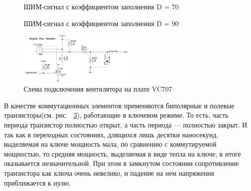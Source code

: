 \documentclass[a4paper,oneside ,10pt]{extreport}
\begin{document}
\begin{figure}[h]
    \centering
    \noindent
    \caption{ШИМ-сигнал с коэффициентом заполнения D = 70}
    \label{fig:pwm_70}
\end{figure}

\begin{figure}[h]
    \centering
    \noindent
    \caption{ШИМ-сигнал с коэффициентом заполнения D = 90}
    \label{fig:pwm_90}
\end{figure}

\begin{figure}[!ht]
	\centering
	\includegraphics[width=0.5\textwidth]{image/SCH_FAN.PNG}
	\caption{Схема подключения вентилятора на плате VC707}
	\label{SCH_FAN}
\end{figure}

В качестве коммутационных элементов применяются биполярные и полевые транзисторы(см. рис. ~\ref{SCH_FAN}),
работающие в ключевом режиме. То есть, часть периода транзистор полностью открыт, 
а часть периода — полностью закрыт. И так как в переходных состояниях, длящихся лишь десятки наносекунд,
выделяемая на ключе мощность мала, по сравнению с коммутируемой
мощностью, то средняя мощность, выделяемая в виде тепла на ключе, в
итоге оказывается незначительной. При этом в замкнутом состоянии 
сопротивление транзистора как ключа очень невелико, и падение на нем напряжения приближается к нулю.
\end{document}
